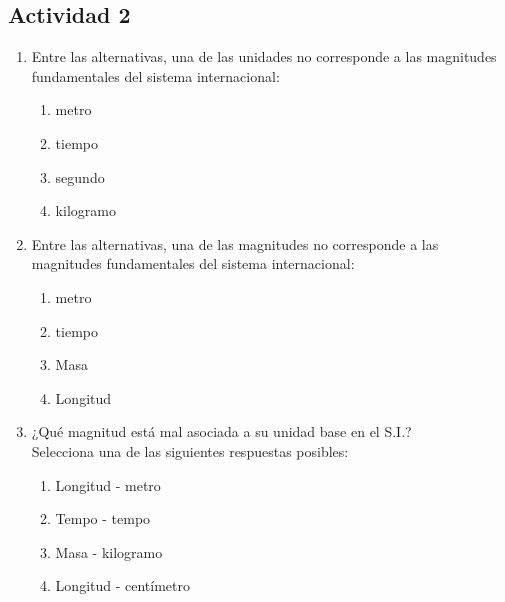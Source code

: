 \documentclass[12pt]{article}
\begin{document}
 \begin{tcolorbox} [colback=red!15!white]
 \centering
 \section*{Actividad 2}
  \end{tcolorbox}
 \begin{enumerate}
     \item Entre las alternativas, una de las unidades no corresponde a las magnitudes fundamentales del sistema internacional:
     \begin{multicols}{2}
     \begin{enumerate}
         \item metro
         \item tiempo
         \item segundo
         \item kilogramo
              \end{enumerate}
     \end{multicols}
     
      
     
 
     \item Entre las alternativas, una de las magnitudes no corresponde a las magnitudes fundamentales del sistema internacional:
     \begin{multicols}{2}
     \begin{enumerate}
         \item metro
         \item tiempo
         \item Masa
         \item Longitud
              \end{enumerate}
     \end{multicols}
      
      
      \item ¿Qué magnitud está mal asociada a su unidad base en el S.I.?\\
      Selecciona una de las siguientes respuestas posibles:
      \begin{multicols}{2}
     \begin{enumerate}
         \item Longitud - metro
         \item Tempo - tempo
         \item Masa - kilogramo
         \item Longitud - centímetro
              \end{enumerate}
     \end{multicols}
      

\end{enumerate}
\end{document}
